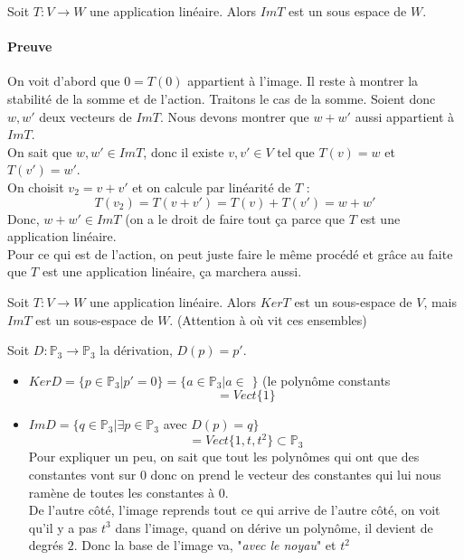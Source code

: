 \begin{theoreme}
    Soit $T : V \to W$ une application linéaire. Alors $Im T$ est un sous espace de $W$.
\end{theoreme}
\paragraph{Preuve}
On voit d'abord que $0 = T(0)$ appartient à l'image. Il reste à montrer la stabilité de la somme et de l'action. Traitons le cas de la somme. Soient donc $w, w'$ deux vecteurs de $Im T$. Nous devons montrer que $w + w'$ aussi appartient à $Im T$.
\\
On sait que $w, w' \in ImT$, donc il existe $v, v' \in V \text{ tel que } T(v) = w $ et $T(v') = w'$.\\
On choisit $v_2 = v + v'$ et on calcule par linéarité de $T$ : \[T(v_2) = T(v + v') = T(v) + T(v') = w + w'\]
Donc, $w + w' \in Im T$  (on a le droit de faire tout ça parce que $T$ est une application linéaire.
\\
Pour ce qui est de l'action, on peut juste faire le même procédé et grâce au faite que $T$ est une application linéaire, ça marchera aussi.


\begin{framedremark}
    Soit $T : V \to W$ une application linéaire. Alors $Ker T$ est un sous-espace de $V$, mais $Im T$ est un sous-espace de $W$. (Attention à où vit ces ensembles)
\end{framedremark}

\begin{exemple}
    Soit $D : \mathbb{P}_3 \to \mathbb{P}_3$ la dérivation, $D(p) = p'$.
    \begin{itemize}
        \item $Ker D = \{p \in \mathbb{P}_3 | p' = 0\} = \{a \in \mathbb{P}_3 | a \in $ \R $\}$ (le polynôme constants \[= Vect\{1\}\]

        \item $Im D = \{q \in \mathbb{P}_3 | \exists p \in \mathbb{P}_3$ avec $D(p)  = q\}$
\[= Vect\{1, t, t^2\} \subset \mathbb{P}_3\]
Pour expliquer un peu, on sait que tout les polynômes qui ont que des constantes vont sur $0$ donc on prend le vecteur des constantes qui lui nous ramène de toutes les constantes à $0$.\\
De l'autre côté, l'image reprends tout ce qui arrive de l'autre côté, on voit qu'il y a pas $t^3$ dans l'image, quand on dérive un polynôme, il devient de degrés $2$. Donc la base de l'image va, "\textit{avec le noyau}" et $t^2$

    \end{itemize}
\end{exemple}

